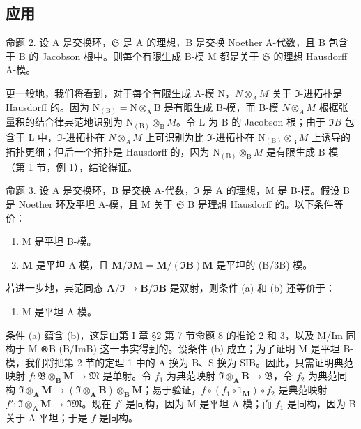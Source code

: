 \subsection{应用}

命题 2. 设 A 是交换环，\(\mathfrak{S}\) 是 A 的理想，B 是交换 Noether A-代数，且 B 包含于 B 的 Jacobson 根中。则每个有限生成 B-模 M 都是关于 \(\mathfrak{S}\) 的理想 Hausdorff A-模。

更一般地，我们将看到，对于每个有限生成 A-模 N，\(N \otimes_{A} M\) 关于 \(\Im\)-进拓扑是 Hausdorff 的。因为 \(\mathrm{N}_{(\mathrm{B})} = \mathrm{N} \otimes_{\mathrm{A}} \mathrm{B}\) 是有限生成 B-模，而 B-模 \(N \otimes_{A} M\) 根据张量积的结合律典范地识别为 \(\mathrm{N}_{(\mathrm{B})} \otimes_{\mathrm{B}} M\)。令 L 为 B 的 Jacobson 根；由于 \(\Im B\) 包含于 L 中，\(\Im\)-进拓扑在 \(N \otimes_{A} M\) 上可识别为比 \(\Im\)-进拓扑在 \(\mathrm{N}_{(\mathrm{B})} \otimes_{\mathrm{B}} M\) 上诱导的拓扑更细；但后一个拓扑是 Hausdorff 的，因为 \(\mathrm{N}_{(\mathrm{B})} \otimes_{\mathrm{B}} M\) 是有限生成 B-模（第 1 节，例 1），结论得证。

命题 3. 设 A 是交换环，B 是交换 A-代数，\(\mathfrak{I}\) 是 A 的理想，M 是 B-模。假设 B 是 Noether 环及平坦 A-模，且 M 关于 \(\mathfrak{S}\) B 是理想 Hausdorff 的。以下条件等价：

\begin{enumerate}
\def\labelenumi{(\alph{enumi})}
\item
  M 是平坦 B-模。
\item
  \(\mathbf{M}\) 是平坦 A-模，且 \(\mathbf{M} / \Im \mathbf{M} = \mathbf{M} / (\Im \mathbf{B})\mathbf{M}\) 是平坦的 (B/3B)-模。
\end{enumerate}

若进一步地，典范同态 \(\mathbf{A} / \Im \to \mathbf{B} / \Im \mathbf{B}\) 是双射，则条件 (a) 和 (b) 还等价于：

\begin{enumerate}
\def\labelenumi{(\alph{enumi})}
\setcounter{enumi}{2}
\tightlist
\item
  M 是平坦 A-模。
\end{enumerate}

条件 (a) 蕴含 (b)，这是由第 I 章 §2 第 7 节命题 8 的推论 2 和 3，以及 M/Im 同构于 M ⊗B (B/ImB) 这一事实得到的。设条件 (b) 成立；为了证明 M 是平坦 B-模，我们将把第 2 节的定理 1 中的 A 换为 B、S 换为 SIB。因此，只需证明典范映射 \(f\colon \mathfrak{B} \otimes_{\mathbf{B}} \mathbf{M} \to \mathfrak{M}\) 是单射。令 \(f_1\) 为典范映射 \(\mathfrak{I} \otimes_{\mathbf{A}} \mathbf{B} \to \mathfrak{B}\)，令 \(f_2\) 为典范同构 \(\mathfrak{I} \otimes_{\mathbf{A}} \mathbf{M} \to (\mathfrak{I} \otimes_{\mathbf{A}} \mathbf{B}) \otimes_{\mathbf{B}} \mathbf{M}\)；易于验证，\(f \circ (f_1 \circ 1_{\mathbf{M}}) \circ f_2\) 是典范映射 \(f'\colon \mathfrak{I} \otimes_{\mathbf{A}} \mathbf{M} \to \mathfrak{IM}\)。现在 \(f'\) 是同构，因为 M 是平坦 A-模；而 \(f_1\) 是同构，因为 B 关于 A 平坦；于是 \(f\) 是同构。

